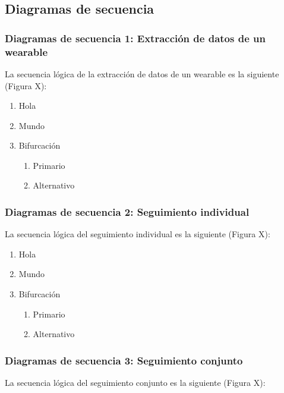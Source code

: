 \subsection{Diagramas de secuencia}

    \subsubsection{Diagramas de secuencia 1: Extracción de datos de un \gls{wearable}}
        La secuencia lógica de la extracción de datos de un \gls{wearable} es la siguiente (Figura X):

        \begin{enumerate}
            \item Hola
            \item Mundo
            \item Bifurcación
            \begin{enumerate}
                \item Primario
                \item Alternativo
            \end{enumerate}
        \end{enumerate}
    
    \subsubsection{Diagramas de secuencia 2: Seguimiento individual}
        La secuencia lógica del seguimiento individual es la siguiente (Figura X):

        \begin{enumerate}
            \item Hola
            \item Mundo
            \item Bifurcación
            \begin{enumerate}
                \item Primario
                \item Alternativo
            \end{enumerate}
        \end{enumerate}
    
    \subsubsection{Diagramas de secuencia 3: Seguimiento conjunto}
        La secuencia lógica del seguimiento conjunto es la siguiente (Figura X):

